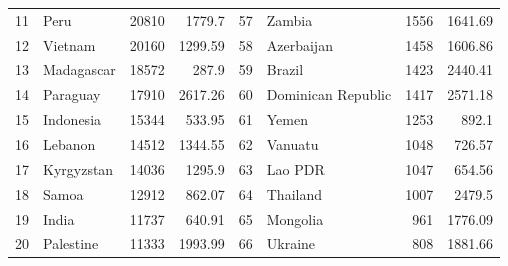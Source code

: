 \begin{longtable}{|c|l|r|r|c|l|r|r|}
	11          & Peru                  & 20810                              & 1779.7                          & 57          & Zambia                & 1556                               & 1641.69                         \\
	12          & Vietnam               & 20160                              & 1299.59                         & 58          & Azerbaijan            & 1458                               & 1606.86                         \\
	13          & Madagascar            & 18572                              & 287.9                           & 59          & Brazil                & 1423                               & 2440.41                         \\
	14          & Paraguay              & 17910                              & 2617.26                         & 60          & Dominican Republic    & 1417                               & 2571.18                         \\
	15          & Indonesia             & 15344                              & 533.95                          & 61          & Yemen                 & 1253                               & 892.1                           \\
	16          & Lebanon               & 14512                              & 1344.55                         & 62          & Vanuatu               & 1048                               & 726.57                          \\
	17          & Kyrgyzstan            & 14036                              & 1295.9                          & 63          & Lao PDR               & 1047                               & 654.56                          \\
	18          & Samoa                 & 12912                              & 862.07                          & 64          & Thailand              & 1007                               & 2479.5                          \\
	19          & India                 & 11737                              & 640.91                          & 65          & Mongolia              & 961                                & 1776.09                         \\
	20          & Palestine             & 11333                              & 1993.99                         & 66          & Ukraine               & 808                                & 1881.66                         \\

\end{longtable}
